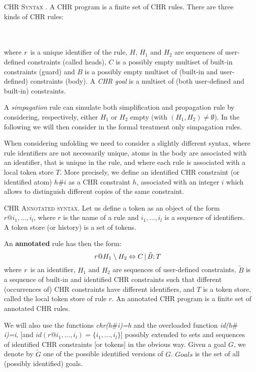\documentclass[final]{acmtrans2e}
\begin{document}
\begin{definition}\textsc{CHR Syntax} \cite{Fru98}.
A CHR program is a finite set of CHR rules.
There are three kinds of CHR rules:

\\
\\
\noindent where ${\it r
}$ is a unique identifier of the rule, $H$, $H_1$ and $H_2$ are
sequences of user-defined constraints (called heads), $C$ is a
possibly empty multiset of built-in constraints (guard) and $B$ is
a possibly empty multiset of (built-in and user-defined)
constraints (body). A \emph{CHR goal} is a multiset of (both
user-defined and built-in) constraints.
\end{definition}

A  \emph{simpagation} rule can simulate both simplification and
propagation rule by considering, respectively, either $H_1$ or
$H_2$ empty (with $(H_1,H_2)\neq \emptyset$). In the following we
will then consider in the formal treatment only simpagation rules.

When considering unfolding we need to consider a slightly
different syntax,  where rule identifiers are not necessarily
unique, atoms in the body are associated with an identifier,
that is unique in the rule, and
where each rule is associated  with a local token store $T$.
More precisely, we define an identified CHR constraint  (or
identified atom) $h\#i$ as a CHR constraint $h$, associated with
an integer $i$ which allows to distinguish different copies of the
same constraint.

\begin{definition}\textsc{CHR Annotated syntax.}
Let us define a token as an object of the form $r@i_1, \ldots, i_l$, where $r$
is the name of a rule and $i_1, \ldots, i_l$ is a sequence of identifiers.
A token store (or history) is a set of tokens.


\noindent An \textbf{annotated} rule has then the form:
$${\it r}@ H_1
\setminus H_2 \Leftrightarrow C  \,|\,  \tilde B;T$$ where ${\it r }$
is an identifier, $H_1$ and $H_2$ are
sequences of user-defined constraints, $\tilde B$
is a sequence of built-in and identified CHR constraints
such that different (occurrences of) CHR constraints have different identifiers,
and $T$ is a token store, called the local token store of rule $r$.
An annotated CHR program is a finite set of annotated CHR rules.
\end{definition}
We will also use the functions {\em chr(h$\#$i)=h} and the overloaded
function {\em id(h$\#$i)=i}, [and $id(r@i_1,\ldots,i_l)=\{i_1, \ldots, i_l\}$]
possibly extended to sets and sequences of identified CHR constraints [or tokens] in
the obvious way. Given a goal $G$, we denote by $\tilde G$ one of the
possible identified versions of $G$. $Goals$ is the set of all (possibly
identified) goals.
\end{document}
